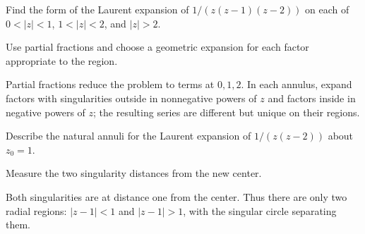 \begin{exercise}\label{exr:iv08-expand-15}
Find the form of the Laurent expansion of \(1/(z(z-1)(z-2))\) on each of \(0<|z|<1\), \(1<|z|<2\), and \(|z|>2\).
\end{exercise}
\begin{hint}
Use partial fractions and choose a geometric expansion for each factor appropriate to the region.
\end{hint}
\begin{solution}
Partial fractions reduce the problem to terms at \(0,1,2\). In each annulus, expand factors with singularities outside in nonnegative powers of \(z\) and factors inside in negative powers of \(z\); the resulting series are different but unique on their regions.
\end{solution}

\begin{exercise}\label{exr:iv08-expand-16}
Describe the natural annuli for the Laurent expansion of \(1/(z(z-2))\) about \(z_0=1\).
\end{exercise}
\begin{hint}
Measure the two singularity distances from the new center.
\end{hint}
\begin{solution}
Both singularities are at distance one from the center. Thus there are only two radial regions: \(|z-1|<1\) and \(|z-1|>1\), with the singular circle separating them.
\end{solution}

